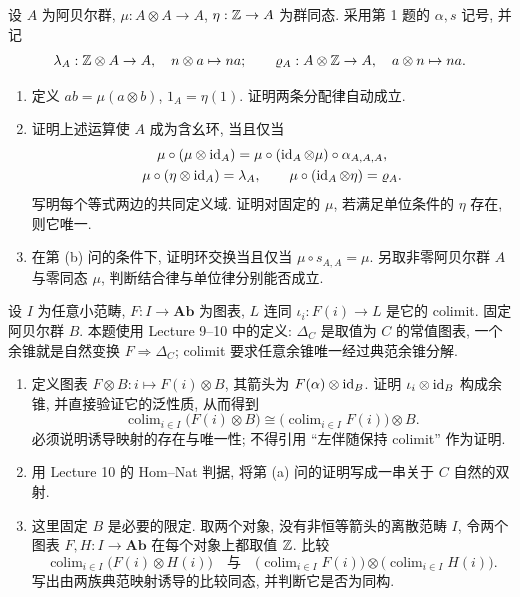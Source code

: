 \documentclass{article}
\begin{document}
\begin{problem}
设 $A$ 为阿贝尔群, $\mu:A\otimes A\to A$, $\eta:\mathbb{Z}\to A$ 为群同态. 采用第 1 题的 $\alpha,s$ 记号, 并记
\[
  \lambda_A:\mathbb{Z}\otimes A\to A,\quad n\otimes a\mapsto na;\qquad
  \varrho_A:A\otimes\mathbb{Z}\to A,\quad a\otimes n\mapsto na.
\]
\begin{enumerate}
  \item[(a)] 定义 $ab=\mu(a\otimes b)$, $1_A=\eta(1)$. 证明两条分配律自动成立.
  \item[(b)] 证明上述运算使 $A$ 成为含幺环, 当且仅当
  \begin{gather*}
    \mu\circ(\mu\otimes\operatorname{id}_A)=\mu\circ(\operatorname{id}_A\otimes\mu)\circ\alpha_{A,A,A},\\
    \mu\circ(\eta\otimes\operatorname{id}_A)=\lambda_A,\qquad
    \mu\circ(\operatorname{id}_A\otimes\eta)=\varrho_A.
  \end{gather*}
  写明每个等式两边的共同定义域. 证明对固定的 $\mu$, 若满足单位条件的 $\eta$ 存在, 则它唯一.
  \item[(c)] 在第 (b) 问的条件下, 证明环交换当且仅当 $\mu\circ s_{A,A}=\mu$. 另取非零阿贝尔群 $A$ 与零同态 $\mu$, 判断结合律与单位律分别能否成立.
\end{enumerate}
\end{problem}

\begin{problem}
设 $I$ 为任意小范畴, $F:I\to\mathbf{Ab}$ 为图表, $L$ 连同 $\iota_i:F(i)\to L$ 是它的 colimit. 固定阿贝尔群 $B$. 本题使用 Lecture 9--10 中的定义: $\Delta_C$ 是取值为 $C$ 的常值图表, 一个余锥就是自然变换 $F\Rightarrow\Delta_C$; colimit 要求任意余锥唯一经过典范余锥分解.
\begin{enumerate}
  \item[(a)] 定义图表 $F\otimes B:i\mapsto F(i)\otimes B$, 其箭头为 $F(\alpha)\otimes\operatorname{id}_B$. 证明 $\iota_i\otimes\operatorname{id}_B$ 构成余锥, 并直接验证它的泛性质, 从而得到
  \[
    \operatorname{colim}_{i\in I}\bigl(F(i)\otimes B\bigr)
    \cong\bigl(\operatorname{colim}_{i\in I}F(i)\bigr)\otimes B.
  \]
  必须说明诱导映射的存在与唯一性; 不得引用 ``左伴随保持 colimit'' 作为证明.
  \item[(b)] 用 Lecture 10 的 Hom--Nat 判据, 将第 (a) 问的证明写成一串关于 $C$ 自然的双射.
  \item[(c)] 这里固定 $B$ 是必要的限定. 取两个对象, 没有非恒等箭头的离散范畴 $I$, 令两个图表 $F,H:I\to\mathbf{Ab}$ 在每个对象上都取值 $\mathbb{Z}$. 比较
  \[
    \operatorname{colim}_{i\in I}\bigl(F(i)\otimes H(i)\bigr)
    \quad\text{与}\quad
    \bigl(\operatorname{colim}_{i\in I}F(i)\bigr)\otimes
    \bigl(\operatorname{colim}_{i\in I}H(i)\bigr).
  \]
  写出由两族典范映射诱导的比较同态, 并判断它是否为同构.
\end{enumerate}
\end{problem}
\end{document}
